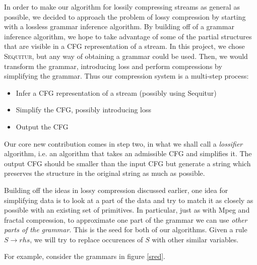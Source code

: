 \documentclass[11pt]{article}
\newcommand{\Sequitur}{\textsc{Sequitur}\xspace}
\begin{document}
In order to make our algorithm for lossily compressing streams
as general as possible, we decided
to approach the problem of lossy compression by starting with a lossless
grammar inference algorithm. 
By building off of a grammar inference algorithm, we
hope to take advantage of some of the partial structures
that are visible in a CFG representation of a stream. 
In this project, we chose \Sequitur, but
any way of obtaining a grammar could be used. Then, we would transform
the grammar, introducing loss and perform compressions by simplifying
the grammar. Thus our compression system is a multi-step process:

\begin{itemize}
\item Infer a CFG representation of a stream (possibly using Sequitur)
\item Simplify the CFG, possibly introducing loss
\item Output the CFG
\end{itemize}


Our core new contribution comes in step two, in what we shall call a \emph{lossifier} 
algorithm, i.e. an algorithm that takes
an admissible CFG and simplifies it. The output CFG should be smaller
than the input CFG but generate a string which preserves the
structure in the original string as much as possible. 

Building off the ideas in lossy compression discussed
earlier, one idea for simplifying data is to look at a part
of the data and try to match it as closely as possible with an
existing set of primitives. In particular, just as with Mpeg and
fractal compression, to approximate one part of the grammar
we can use \emph{other parts of the grammar}. This is the seed for
both of our algorithms. Given a rule $S \rightarrow rhs$, we will
try to replace occurences of $S$ with other similar variables.

For example, consider the grammars in figure \ref{sred}.
\end{document}

